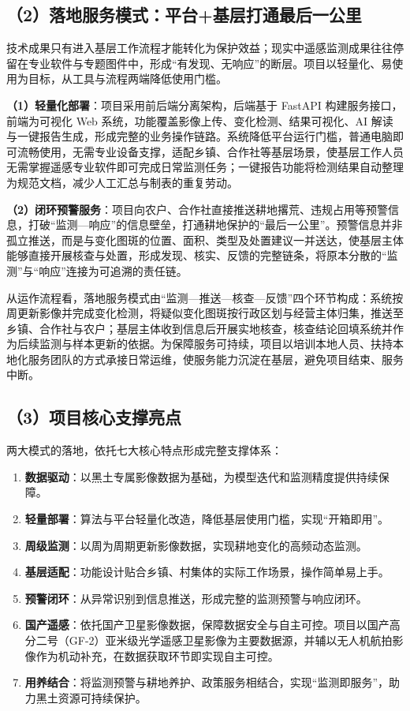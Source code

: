 \subsection{（2）落地服务模式：平台+基层打通最后一公里}

技术成果只有进入基层工作流程才能转化为保护效益；现实中遥感监测成果往往停留在专业软件与专题图件中，形成“有发现、无响应”的断层。项目以轻量化、易使用为目标，从工具与流程两端降低使用门槛。

\textbf{（1）轻量化部署}：项目采用前后端分离架构，后端基于 FastAPI 构建服务接口，前端为可视化 Web 系统，功能覆盖影像上传、变化检测、结果可视化、AI 解读与一键报告生成，形成完整的业务操作链路。系统降低平台运行门槛，普通电脑即可流畅使用，无需专业设备支撑，适配乡镇、合作社等基层场景，使基层工作人员无需掌握遥感专业软件即可完成日常监测任务；一键报告功能将检测结果自动整理为规范文档，减少人工汇总与制表的重复劳动。

\textbf{（2）闭环预警服务}：项目向农户、合作社直接推送耕地撂荒、违规占用等预警信息，打破“监测—响应”的信息壁垒，打通耕地保护的“最后一公里”。预警信息并非孤立推送，而是与变化图斑的位置、面积、类型及处置建议一并送达，使基层主体能够直接开展核查与处置，形成发现、核实、反馈的完整链条，将原本分散的“监测”与“响应”连接为可追溯的责任链。

从运作流程看，落地服务模式由“监测—推送—核查—反馈”四个环节构成：系统按周更新影像并完成变化检测，将疑似变化图斑按行政区划与经营主体归集，推送至乡镇、合作社与农户；基层主体收到信息后开展实地核查，核查结论回填系统并作为后续监测与样本更新的依据。为保障服务可持续，项目以培训本地人员、扶持本地化服务团队的方式承接日常运维，使服务能力沉淀在基层，避免项目结束、服务中断。

\subsection{（3）项目核心支撑亮点}

两大模式的落地，依托七大核心特点形成完整支撑体系：

\begin{enumerate}
  \item \textbf{数据驱动}：以黑土专属影像数据为基础，为模型迭代和监测精度提供持续保障。
  \item \textbf{轻量部署}：算法与平台轻量化改造，降低基层使用门槛，实现“开箱即用”。
  \item \textbf{周级监测}：以周为周期更新影像数据，实现耕地变化的高频动态监测。
  \item \textbf{基层适配}：功能设计贴合乡镇、村集体的实际工作场景，操作简单易上手。
  \item \textbf{预警闭环}：从异常识别到信息推送，形成完整的监测预警与响应闭环。
  \item \textbf{国产遥感}：依托国产卫星影像数据，保障数据安全与自主可控。项目以国产高分二号（GF-2）亚米级光学遥感卫星影像为主要数据源，并辅以无人机航拍影像作为机动补充，在数据获取环节即实现自主可控。
  \item \textbf{用养结合}：将监测预警与耕地养护、政策服务相结合，实现“监测即服务”，助力黑土资源可持续保护。
\end{enumerate}

